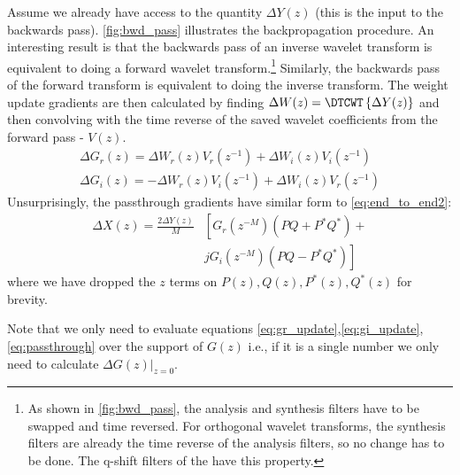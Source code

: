 \documentclass[9pt]{article}
\begin{document}
Assume we already have access to the quantity $\Delta Y(z)$ (this is the input
to the backwards pass). \autoref{fig:bwd_pass} illustrates the backpropagation procedure. An
interesting result is that the backwards pass of an inverse wavelet transform is equivalent to doing
a forward wavelet transform.\footnote{As shown in \autoref{fig:bwd_pass}, the analysis and synthesis
  filters have to be swapped and time reversed. For orthogonal wavelet transforms, the synthesis
  filters are already the time reverse of the analysis filters, so no change has to be done. The q-shift filters of the
\DTCWT \cite{kingsbury_design_2003} have this property.} Similarly, the backwards pass of the forward transform is equivalent to
doing the inverse transform. The weight update gradients are then calculated by finding $\Delta W(z)
= \DTCWT\left\{ \Delta Y(z) \right\}$ and then convolving with the time reverse of the saved wavelet coefficients from
the forward pass - $V(z)$.
\begin{gather}
  \Delta G_r(z) = \Delta W_r(z) V_r(z^{-1}) + \Delta W_i(z) V_i(z^{-1})  \label{eq:gr_update}\\
  \Delta G_i(z) =  -\Delta W_r(z) V_i(z^{-1}) + \Delta W_i(z) V_r(z^{-1})  \label{eq:gi_update} 
\end{gather}
Unsurprisingly, the passthrough gradients have similar form to \autoref{eq:end_to_end2}:
\begin{equation}\label{eq:passthrough}
  \begin{split}
    \Delta X(z) = \frac{2\Delta Y(z)}{M} & \left[G_r(z^{-M})\left( PQ + P^*Q^* \right)\right. + \\
      & \left. jG_i(z^{-M}) \left(PQ-P^*Q^* \right) \right] 
\end{split}
\end{equation}
where we have dropped the $z$ terms on $P(z), Q(z), P^*(z), Q^*(z)$ for brevity.

Note that we only need to evaluate equations
\ref{eq:gr_update},\ref{eq:gi_update},\ref{eq:passthrough} over the support of $G(z)$ 
i.e., if it is a single number we only need to calculate $\left.\Delta G(z)\right\rvert_{z=0}$.
\end{document}
